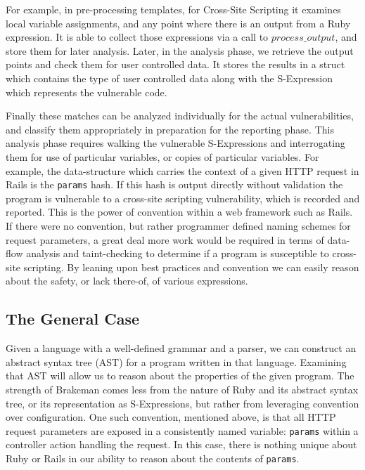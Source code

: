 \documentclass[conference]{IEEEtran}
\begin{document}
For example, in pre-processing templates, for Cross-Site Scripting it examines
local variable assignments, and any point where there is an output from a Ruby
expression.  It is able to collect those expressions via a call to
$process\_output$, and store them for later analysis.  Later, in the analysis
phase, we retrieve the output points and check them for user controlled data. It
stores the results in a struct which contains the type of user controlled data
along with the S-Expression which represents the vulnerable code.

Finally these matches can be analyzed individually for the actual
vulnerabilities, and classify them appropriately in preparation for the
reporting phase.  This analysis phase requires walking the vulnerable
S-Expressions and interrogating them for use of particular variables, or copies
of particular variables.  For example, the data-structure which carries the
context of a given HTTP request in Rails is the \texttt{params} hash.  If this
hash is output directly without validation the program is vulnerable to a
cross-site scripting vulnerability, which is recorded and reported.  This is the
power of convention within a web framework such as Rails.  If there were no
convention, but rather programmer defined naming schemes for request parameters,
a great deal more work would be required in terms of data-flow analysis and
taint-checking to determine if a program is susceptible to cross-site scripting.
By leaning upon best practices and convention we can easily reason about the
safety, or lack there-of, of various expressions.

\subsection{The General Case}

Given a language with a well-defined grammar and a parser, we can construct an
abstract syntax tree (AST) for a program written in that language.  Examining
that AST will allow us to reason about the properties of the given program.  The
strength of Brakeman comes less from the nature of Ruby and its abstract syntax
tree, or its representation as S-Expressions, but rather from leveraging
convention over configuration.  One such convention, mentioned above, is that
all HTTP request parameters are exposed in a consistently named variable:
\texttt{params} within a controller action handling the request.  In this case,
there is nothing unique about Ruby or Rails in our ability to reason about the
contents of \texttt{params}.
\end{document}
